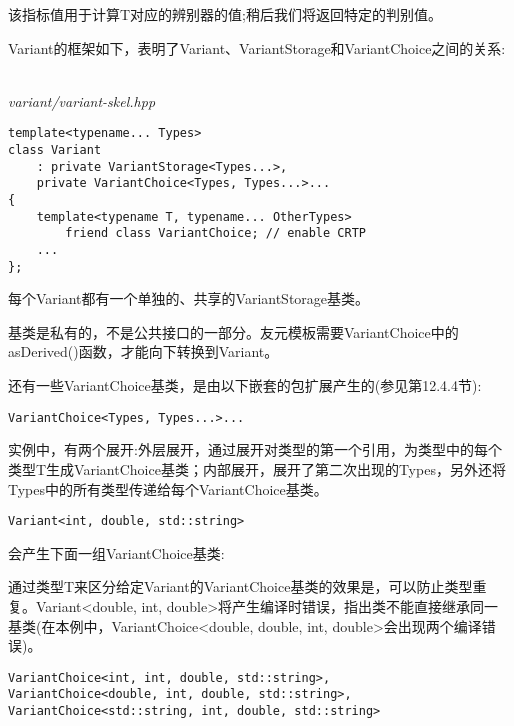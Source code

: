 该指标值用于计算T对应的辨别器的值;稍后我们将返回特定的判别值。

Variant的框架如下，表明了Variant、VariantStorage和VariantChoice之间的关系:

\hspace*{\fill} \\ %
\noindent
\textit{variant/variant-skel.hpp}
\begin{lstlisting}[style=styleCXX]
template<typename... Types>
class Variant
	: private VariantStorage<Types...>,
	private VariantChoice<Types, Types...>...
{
	template<typename T, typename... OtherTypes>
		friend class VariantChoice; // enable CRTP
	...
};
\end{lstlisting}

每个Variant都有一个单独的、共享的VariantStorage基类。

\begin{tcolorbox}[colback=webgreen!5!white,colframe=webgreen!75!black]
\hspace*{0.75cm}基类是私有的，不是公共接口的一部分。友元模板需要VariantChoice中的asDerived()函数，才能向下转换到Variant。
\end{tcolorbox}

还有一些VariantChoice基类，是由以下嵌套的包扩展产生的(参见第12.4.4节):

\begin{lstlisting}[style=styleCXX]
VariantChoice<Types, Types...>...
\end{lstlisting}

实例中，有两个展开:外层展开，通过展开对类型的第一个引用，为类型中的每个类型T生成VariantChoice基类；内部展开，展开了第二次出现的Types，另外还将Types中的所有类型传递给每个VariantChoice基类。

\begin{lstlisting}[style=styleCXX]
Variant<int, double, std::string>
\end{lstlisting}

会产生下面一组VariantChoice基类:

\begin{tcolorbox}[colback=webgreen!5!white,colframe=webgreen!75!black]
\hspace*{0.75cm}通过类型T来区分给定Variant的VariantChoice基类的效果是，可以防止类型重复。Variant<double, int, double>将产生编译时错误，指出类不能直接继承同一基类(在本例中，VariantChoice<double, double, int, double>会出现两个编译错误)。
\end{tcolorbox}

\begin{lstlisting}[style=styleCXX]
VariantChoice<int, int, double, std::string>,
VariantChoice<double, int, double, std::string>,
VariantChoice<std::string, int, double, std::string>
\end{lstlisting}

